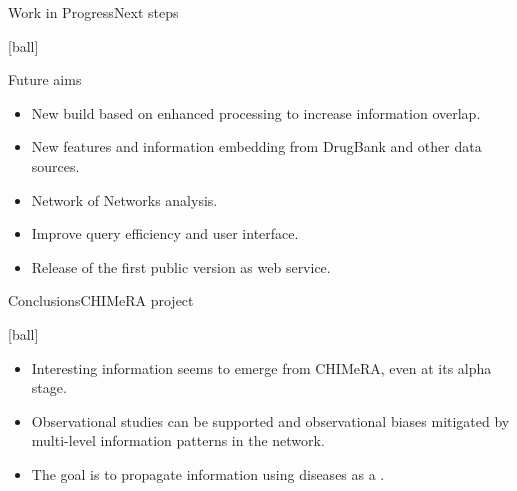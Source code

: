 \documentclass{standalone}
\begin{document}
\begin{frame}{Work in Progress}{Next steps}

  [ball]

  \begin{block}{Future aims}

    \begin{itemize}
      \setlength\itemsep{2em}
      \item New build based on enhanced processing to increase information overlap.

      \item New features and information embedding from DrugBank and other data sources.

      \item Network of Networks analysis.

      \item Improve query efficiency and user interface.

      \item Release of the first public version as web service.
    \end{itemize}

  \end{block}

\end{frame}

\begin{frame}{Conclusions}{CHIMeRA project}

  [ball]

  \begin{itemize}
    \setlength\itemsep{2em}
    \item Interesting information seems to emerge from CHIMeRA, even at its alpha stage.

    \item Observational studies can be supported and observational biases mitigated by multi-level information patterns in the network.

    \item The goal is to propagate information using diseases as a .

  \end{itemize}

\end{frame}
\end{document}
